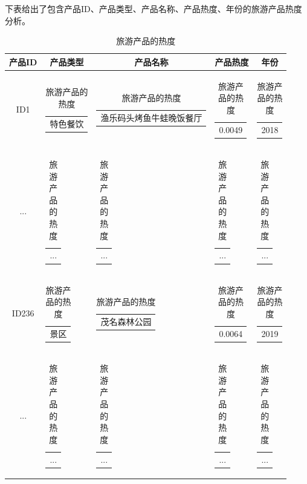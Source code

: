 \documentclass[bwprint]{gmcmthesis}
\begin{document}
下表给出了包含产品ID、产品类型、产品名称、产品热度、年份的旅游产品热度分析。

\begin{center}
  \begin{longtable}{c|c|c|c|c}
    \caption{旅游产品的热度}
    \label{wx_yj_related}\\
      \hline
      \textbf{产品ID} & \textbf{产品类型} & \textbf{产品名称} & \textbf{产品热度}& \textbf{年份}\\
      \hline
      ID1 & \begin{tabular}[c]{@{}c@{}}
        特色餐饮
        \end{tabular} 
        & \begin{tabular}[c]{@{}l@{}}
          渔乐码头烤鱼牛蛙晚饭餐厅
        \end{tabular} 
        & \begin{tabular}[c]{@{}c@{}}
          0.0049
          \end{tabular}
          & \begin{tabular}[c]{@{}c@{}}
            2018
            \end{tabular}\\
        ... & \begin{tabular}[c]{@{}c@{}}
          ...
        \end{tabular} 
        & \begin{tabular}[c]{@{}l@{}}
          ...
        \end{tabular} 
        & \begin{tabular}[c]{@{}c@{}}
          ...
        \end{tabular} 
        & \begin{tabular}[c]{@{}c@{}}
          ...
        \end{tabular} \\

        ID236 & \begin{tabular}[c]{@{}c@{}}
          景区
          \end{tabular} 
          & \begin{tabular}[c]{@{}l@{}}
            茂名森林公园
          \end{tabular} 
          & \begin{tabular}[c]{@{}c@{}}
            0.0064
            \end{tabular}
            & \begin{tabular}[c]{@{}c@{}}
              2019
              \end{tabular}\\
          ... & \begin{tabular}[c]{@{}c@{}}
            ...
          \end{tabular} 
          & \begin{tabular}[c]{@{}l@{}}
            ...
          \end{tabular} 
          & \begin{tabular}[c]{@{}c@{}}
            ...
          \end{tabular} 
          & \begin{tabular}[c]{@{}c@{}}
            ...
          \end{tabular} \\


\end{longtable}
\end{center}
\end{document}

